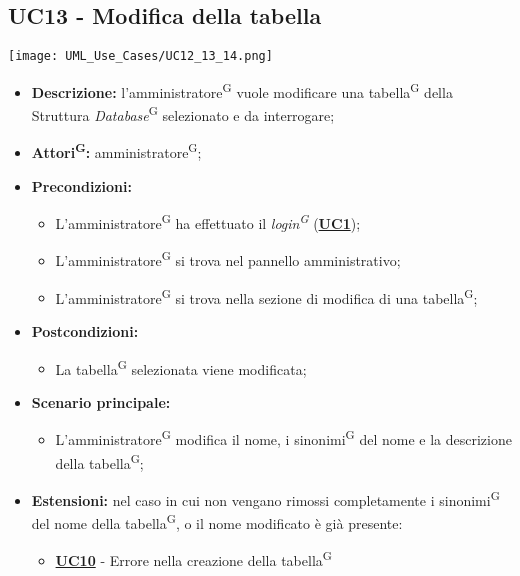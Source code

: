 \subsection{UC13 - Modifica della tabella}
\label{sec:UC13}
\texttt{[image: UML\_Use\_Cases/UC12\_13\_14.png]}
\begin{itemize}
	\item \textbf{Descrizione:} l’amministratore\textsuperscript{G} vuole modificare una tabella\textsuperscript{G} della Struttura \textit{Database}\textsuperscript{G} selezionato e da interrogare;
	\item \textbf{Attori\textsuperscript{G}:} amministratore\textsuperscript{G};
	\item \textbf{Precondizioni:} 
	\begin{itemize}
		\item L’amministratore\textsuperscript{G} ha effettuato il \textit{login\textsuperscript{G}} (\hyperref[sec:UC1]{\textbf{UC1}});
		\item L’amministratore\textsuperscript{G} si trova nel pannello amministrativo;
		\item L’amministratore\textsuperscript{G} si trova nella sezione di modifica di una tabella\textsuperscript{G};
	\end{itemize}
	\item \textbf{Postcondizioni:} 
	\begin{itemize}
		\item La tabella\textsuperscript{G} selezionata viene modificata;
	\end{itemize}
	\item \textbf{Scenario principale:} 
	\begin{itemize}
		\item L’amministratore\textsuperscript{G} modifica il nome, i sinonimi\textsuperscript{G} del nome e la descrizione della tabella\textsuperscript{G};
	\end{itemize}
	\item \textbf{Estensioni:} nel caso in cui non vengano rimossi completamente i sinonimi\textsuperscript{G} del nome della tabella\textsuperscript{G}, o il nome modificato è già presente:
	\begin{itemize}
		\item \hyperref[sec:UC10]{\textbf{UC10}} - Errore nella creazione della tabella\textsuperscript{G}
	\end{itemize}
\end{itemize}

